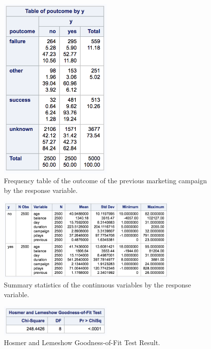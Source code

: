 \documentclass[]{article}
\begin{document}
\begin{figure}
  \centering
    \includegraphics[width=0.5\textwidth]{images/fig13_poutcome.png}
  \caption{Frequency table of the outcome of the previous marketing campaign by the response variable.}
  \label{fig13}
\end{figure}

\begin{figure}
  \centering
    \includegraphics[width=0.8\textwidth]{images/fig14_summary.png}
  \caption{Summary statistics of the continuous variables by the response variable.}
  \label{fig14}
\end{figure}

\begin{figure}
  \centering
    \includegraphics[width=0.5\textwidth]{images/fig15_GOF.png}
  \caption{Hosmer and Lemeshow Goodness-of-Fit Test Result.}
  \label{fig15}
\end{figure}
\end{document}
